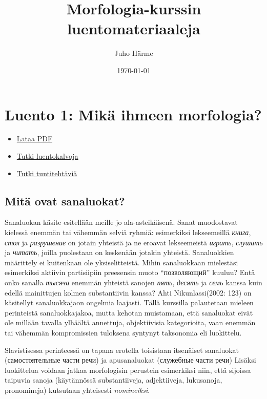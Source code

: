 \documentclass[]{scrartcl}
\author{Juho Härme}
\title{Morfologia-kurssin luentomateriaaleja}
\date{\today}
\providecommand{\tightlist}{%
  \setlength{\itemsep}{0pt}\setlength{\parskip}{0pt}}
\begin{document}
\maketitle
\tableofcontents
\newpage



\section{Luento 1: Mikä ihmeen
morfologia?}\label{luento-1-mikuxe4-ihmeen-morfologia}

\begin{itemize}
\tightlist
\item
  \href{http://mustikka.uta.fi/~juho_harme/morfologia/materiaalit/luento1.pdf}{Lataa
  PDF}
\item
  \href{http://mustikka.uta.fi/~juho_harme/morfologia/presentations/luento1.html}{Tutki
  luentokalvoja}
\item
  \href{http://mustikka.uta.fi/~juho_harme/morfologia/tehtavat/luento1.pdf}{Tutki
  tuntitehtäviä}
\end{itemize}

\subsection{Mitä ovat sanaluokat?}\label{mituxe4-ovat-sanaluokat}

Sanaluokan käsite esitellään meille jo ala-asteikäisenä. Sanat
muodostavat kielessä enemmän tai vähemmän selviä ryhmiä: esimerkiksi
lekseemeillä \emph{книга}, \emph{стол} ja \emph{разрушение} on jotain
yhteistä ja ne eroavat lekseemeistä \emph{играть}, \emph{слушать} ja
\emph{читать}, joilla puolestaan on keskenään jotakin yhteistä.
Sanaluokkien määrittely ei kuitenkaan ole yksiselitteistä. Mihin
sanaluokkaan mielestäsi esimerkiksi aktiivin partisiipiin preesensin
muoto ``позволяющий'' kuuluu? Entä onko sanalla \emph{тысяча} enemmän
yhteistä sanojen \emph{пять}, \emph{десять} ja \emph{семь} kanssa kuin
edellä mainittujen kolmen substantiivin kanssa? Ahti Nikunlassi(2002:
123) on käsitellyt sanaluokkajaon ongelmia laajasti. Tällä kurssilla
palautetaan mieleen perinteistä sanaluokkajakoa, mutta kehotan
muistamaan, että sanaluokat eivät ole millään tavalla ylhäältä
annettuja, objektiivisia kategorioita, vaan enemmän tai vähemmän
kompromissien tuloksena syntynyt taksonomia eli luokittelu.

Slavistisessa perinteessä on tapana erotella toisistaan itsenäiset
sanaluokat (самостоятельные части речи) ja apusanaluokat (служебные
части речи) Lisäksi luokittelua voidaan jatkaa morfologisin perustein
esimerkiksi niin, että sijoissa taipuvia sanoja (käytännössä
substantiiveja, adjektiiveja, lukusanoja, pronomineja) kutsutaan
yhteisesti \emph{nomineiksi}.
\end{document}
